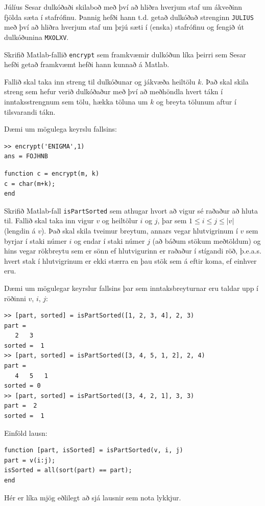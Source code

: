 \documentclass[addpoints]{exam}
\begin{document}
\begin{questions}
\newpage
\question[10] Júlíus Sesar dulkóðaði skilaboð með því að hliðra hverjum staf um ákveðinn fjölda sæta í stafrófinu. 
Þannig hefði hann t.d. getað dulkóðað strenginn \texttt{JULIUS} með því að hliðra hverjum staf um þrjú sæti í (enska) stafrófinu og fengið út dulkóðunina \texttt{MXOLXV}.

Skrifið Matlab-fallið \texttt{encrypt} sem framkvæmir dulkóðun líka þeirri sem Sesar hefði getað framkvæmt hefði hann kunnað á Matlab. 

Fallið skal taka inn streng til dulkóðunar og jákvæða heiltölu $k$. Það skal skila streng sem hefur verið dulkóðaður með því að meðhöndla hvert tákn í inntaksstrengnum sem tölu, hækka töluna um $k$ og breyta tölunum aftur í tilsvarandi tákn.

Dæmi um mögulega keyrslu fallsins:
\begin{verbatim}
>> encrypt('ENIGMA',1)
ans = FOJHNB
\end{verbatim}


\begin{solution}
 
\begin{verbatim}
function c = encrypt(m, k)
c = char(m+k);
end
\end{verbatim}

\end{solution}

\newpage

\question[10] Skrifið Matlab-fall \texttt{isPartSorted} sem athugar hvort að vigur sé raðaður að hluta til. Fallið skal taka inn vigur $v$ og heiltölur $i$ og $j$, þar sem $1 \leq i \leq j \leq |v|$ (lengdin á $v$). 
Það skal skila tveimur breytum, annars vegar hlutvigrinum í $v$ sem byrjar í staki númer $i$ og endar í staki númer $j$ (að báðum stökum meðtöldum) og hins vegar rökbreytu sem er sönn ef hlutvigurinn er raðaður í stígandi röð, þ.e.a.s. hvert stak í hlutvigrinum er ekki stærra en þau stök sem á eftir koma, ef einhver eru.

Dæmi um mögulegar keyrslur fallsins þar sem inntaksbreyturnar eru taldar upp í röðinni $v$, $i$, $j$:

\begin{verbatim}
>> [part, sorted] = isPartSorted([1, 2, 3, 4], 2, 3)
part =
   2   3
sorted =  1
>> [part, sorted] = isPartSorted([3, 4, 5, 1, 2], 2, 4)
part =
   4   5   1
sorted = 0
>> [part, sorted] = isPartSorted([3, 4, 2, 1], 3, 3)
part =  2
sorted =  1
\end{verbatim}

\begin{solution}
Einföld lausn:
\begin{verbatim}
function [part, isSorted] = isPartSorted(v, i, j)
part = v(i:j);
isSorted = all(sort(part) == part);
end
\end{verbatim}
Hér er líka mjög eðlilegt að sjá lausnir sem nota lykkjur.
\end{solution}




\end{questions}
\end{document}
